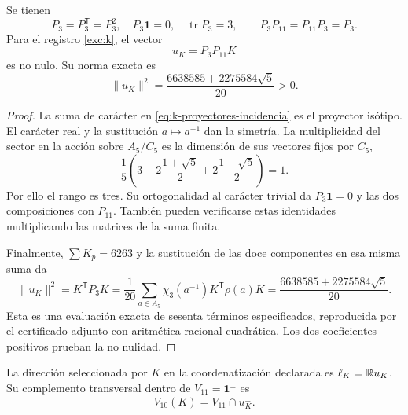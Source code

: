 \begin{lemma}
\label{lem:k-sector-no-nulo}
Se tienen
\[
 P_3=P_3^{\mathsf T}=P_3^2,\quad
 P_3\mathbf1=0,\quad \operatorname{tr}P_3=3,
 \qquad P_3P_{11}=P_{11}P_3=P_3.
\]
Para el registro \eqref{exc:k}, el vector
\begin{equation}
 u_K=P_3P_{11}K
 \label{eq:k-vector-direccional}
\end{equation}
es no nulo. Su norma exacta es
\begin{equation}
 \lVert u_K\rVert^2
 =\frac{6638585+2275584\sqrt5}{20}>0.
 \label{eq:k-norma-direccion}
\end{equation}
\end{lemma}
\begin{proof}
La suma de carácter en \eqref{eq:k-proyectores-incidencia} es el
proyector isótipo. El carácter real y la sustitución \(a\mapsto a^{-1}\)
dan la simetría. La multiplicidad del sector en la acción sobre
\(A_5/C_5\) es la dimensión de sus vectores fijos por \(C_5\),
\[
 \frac15\left(3+2\frac{1+\sqrt5}{2}
                 +2\frac{1-\sqrt5}{2}\right)=1.
\]
Por ello el rango es tres. Su ortogonalidad al carácter trivial
da \(P_3\mathbf1=0\) y las dos composiciones con \(P_{11}\).
También pueden verificarse estas identidades multiplicando las
matrices de la suma finita.

Finalmente, \(\sum K_p=6263\) y la sustitución de las doce
componentes en esa misma suma da
\[
 \lVert u_K\rVert^2=K^{\mathsf T}P_3K
 =\frac1{20}\sum_{a\in A_5}
                \chi_3(a^{-1})K^{\mathsf T}\rho(a)K
 =\frac{6638585+2275584\sqrt5}{20}.
\]
Esta es una evaluación exacta de sesenta términos especificados,
reproducida por el certificado adjunto con aritmética racional
cuadrática. Los dos coeficientes positivos prueban la no nulidad.
\end{proof}

\begin{definition}
La dirección seleccionada por \(K\) en la coordenatización declarada es
\(\ell_K=\mathbb R u_K\). Su complemento transversal dentro de
\(V_{11}=\mathbf1^\perp\) es
\[
 V_{10}(K)=V_{11}\cap u_K^\perp.
\]
\end{definition}

